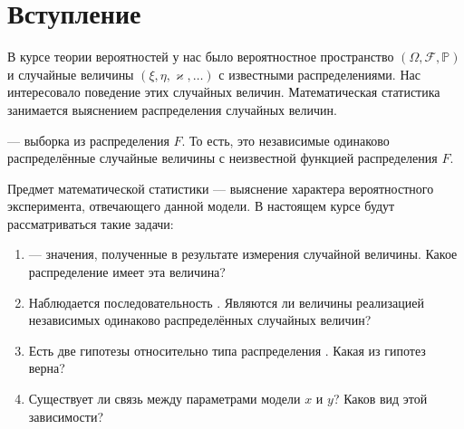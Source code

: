 \chapter*{Вступление}

В курсе теории вероятностей у нас было вероятностное пространство
$\left( \Omega, \mathcal{F}, \mathbb{P} \right)$ и случайные величины
$\left( \xi, \eta, \varkappa, \dots \right)$ с известными распределениями.
Нас интересовало поведение этих случайных величин.
Математическая статистика занимается выяснением распределения случайных величин.

\xsample --- выборка из распределения $F$. То есть, это независимые
одинаково распределённые случайные величины с неизвестной функцией распределения
$F$.

Предмет математической статистики --- выяснение характера вероятностного
эксперимента, отвечающего данной модели.
В настоящем курсе будут рассматриваться такие задачи:
\begin{enumerate}
  \item
    \xsample --- значения, полученные в результате измерения случайной
    величины.
    Какое распределение имеет эта величина?
  \item
    Наблюдается последовательность \xsample.
    Являются ли величины \xsample реализацией независимых
    одинаково распределённых случайных величин?
  \item
    Есть две гипотезы относительно типа распределения \xsample.
    Какая из гипотез верна?
  \item
    Существует ли связь между параметрами модели $x$ и $y$?
    Каков вид этой зависимости?
\end{enumerate}
